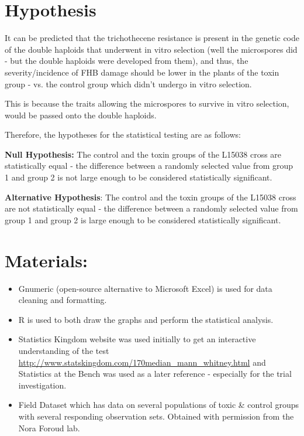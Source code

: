\documentclass[11pt]{article}
\begin{document}
\section{Hypothesis}
\label{sec:orge24c77c}
It can be predicted that the trichothecene resistance is present in the genetic code of the double haploids that underwent in vitro selection (well the microspores did - but the double haploids were developed from them), and thus, the severity/incidence of FHB damage should be 
lower in the plants of the toxin group - vs. the control group which didn't undergo in vitro selection.

This is because the traits allowing the microspores to survive in vitro selection, would be passed onto the double haploids. 

Therefore, the hypotheses for the statistical testing are as follows:

\textbf{Null Hypothesis:} The control and the toxin groups of the L15038 cross are statistically equal - the difference between a randomly selected
value from group 1 and group 2 is not large enough to be considered statistically significant.

\textbf{Alternative Hypothesis}: The control and the toxin groups of the L15038 cross are not statistically equal - the difference between a randomly
selected value from group 1 and group 2 is large enough to be considered statistically significant.
\section{Materials:}
\label{sec:orgd0b14d4}
\begin{itemize}
\item Gnumeric (open-source alternative to Microsoft Excel) is used for data cleaning and formatting.
\item R is used to both draw the graphs and perform the statistical analysis.
\item Statistics Kingdom website was used initially to get an interactive understanding of the test \url{http://www.statskingdom.com/170median\_mann\_whitney.html} and Statistics at the Bench \cite{bremer_doerge_2010} was used as a later reference - especially for the trial investigation.
\item Field Dataset which has data on several populations of toxic \& control groups with several responding observation sets. Obtained with permission from the Nora Foroud lab.
\end{itemize}
\end{document}
